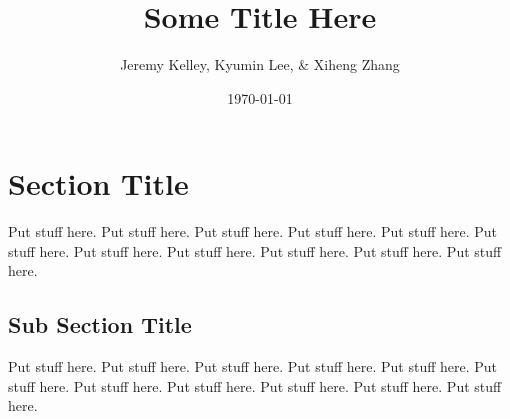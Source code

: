 \documentclass{article}
\begin{document}
\setlength{\parindent}{0pt}
\setlength{\parskip}{.5ex plus 0.5ex minus 0.2ex}




\title{ Some Title Here }

\author{ Jeremy Kelley, Kyumin Lee, \& Xiheng Zhang }

\date{\today}

\maketitle

\section{Section Title}

Put stuff here.  Put stuff here.  Put stuff here.  Put stuff here.  Put stuff
here.  Put stuff here.  Put stuff here.  Put stuff here.  Put stuff here.  Put
stuff here.  Put stuff here.  

\subsection{Sub Section Title}

Put stuff here.  Put stuff here.  Put stuff here.  Put stuff here.  Put stuff
here.  Put stuff here.  Put stuff here.  Put stuff here.  Put stuff here.  Put
stuff here.  Put stuff here.  \cite{weka}


 
\end{document}
